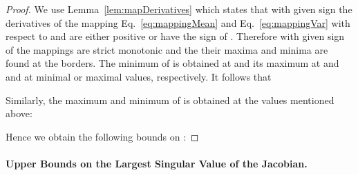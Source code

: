 \documentclass{article}
\begin{document}
\begin{proof}
We use Lemma~\ref{lem:mapDerivatives} which states that with given
sign the derivatives of the mapping   Eq.~\eqref{eq:mappingMean}
and Eq.~\eqref{eq:mappingVar} with respect to  
and  are either positive or have the sign of
.
Therefore with given sign of  the mappings are strict monotonic and
the their maxima and minima are found at the borders.  The minimum of  is obtained at
 and its maximum at  and  and  at minimal or maximal values, respectively.
It follows that


Similarly, the maximum and minimum of  is obtained at the values mentioned above:


Hence we obtain the following bounds on :



\end{proof}





\paragraph{Upper Bounds on the Largest Singular Value of the Jacobian.}
\end{document}

